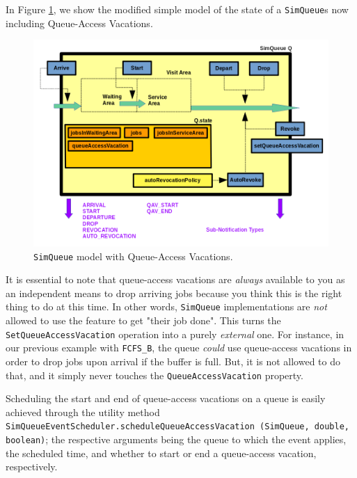 In Figure \ref{fig:QueueAccessVacations},
  we show the modified simple model of the state of
  a \lstinline|SimQueue|s
  now including Queue-Access Vacations.

\begin{figure}[!htbp]
\label{fig:QueueAccessVacations}
\caption{\texttt{SimQueue} model with Queue-Access Vacations.}
\includegraphics[width=\textwidth]{fig/QueueAccessVacation}
\end{figure}
  
\begin{sloppypar}
It is essential to note that queue-access vacations
  are {\em always\/} available to you
  as an independent means to drop arriving jobs
  because you think this is the right thing to do at this time.
In other words,
  \lstinline|SimQueue| implementations
  are {\em not\/} allowed to use the feature
  to get "their job done".
This turns the \lstinline|SetQueueAccessVacation|
  operation into a purely {\em external\/} one.
For instance,
  in our previous example with \lstinline|FCFS_B|,
  the queue {\em could\/} use queue-access vacations
  in order to drop jobs upon arrival
  if the buffer is full.
But, it is not allowed to do that,
  and it simply never touches
  the \lstinline|QueueAccessVacation| property.
\end{sloppypar}

Scheduling the start and end of queue-access vacations on a queue
  is easily achieved through the utility method
  \lstinline|SimQueueEventScheduler.scheduleQueueAccessVacation (SimQueue, double, boolean)|;
  the respective arguments being the queue to which the event applies,
  the scheduled time,
  and whether to start or end a queue-access vacation,
  respectively.
  

